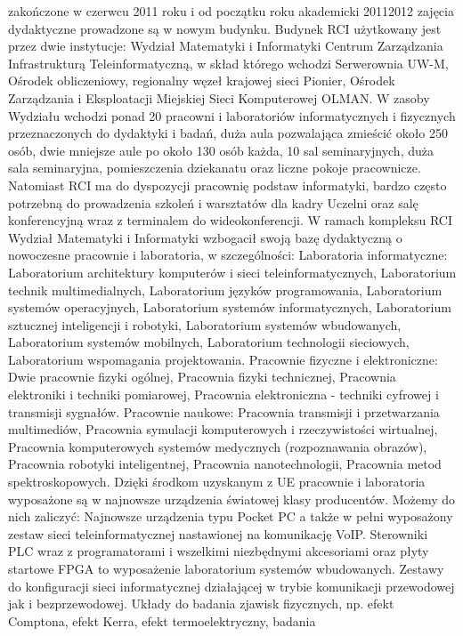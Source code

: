 \documentclass[a4paper,12pt]{article}
\begin{document}
zakończone w czerwcu 2011 roku i od początku roku akademicki 2011\/2012 zajęcia dydaktyczne prowadzone
są w nowym budynku.
Budynek RCI użytkowany jest przez dwie instytucje:
Wydział Matematyki i Informatyki
Centrum Zarządzania Infrastrukturą Teleinformatyczną, w skład którego wchodzi Serwerownia UW-M,
Ośrodek obliczeniowy, regionalny węzeł krajowej sieci Pionier, Ośrodek Zarządzania i Eksploatacji
Miejskiej Sieci Komputerowej OLMAN.
W zasoby Wydziału wchodzi ponad 20 pracowni i laboratoriów informatycznych i fizycznych przeznaczonych
do dydaktyki i badań, duża aula pozwalająca zmieścić około 250 osób, dwie mniejsze aule po około 130 osób
każda, 10 sal seminaryjnych, duża sala seminaryjna, pomieszczenia dziekanatu oraz liczne pokoje pracownicze.
Natomiast RCI ma do dyspozycji pracownię podstaw informatyki, bardzo często potrzebną do prowadzenia
szkoleń i warsztatów dla kadry Uczelni oraz salę konferencyjną wraz z terminalem do wideokonferencji.
W ramach kompleksu RCI Wydział Matematyki i Informatyki wzbogacił swoją bazę dydaktyczną o
nowoczesne pracownie i laboratoria, w szczególności:
Laboratoria informatyczne:
Laboratorium architektury komputerów i sieci teleinformatycznych,
Laboratorium technik multimedialnych,
Laboratorium języków programowania,
Laboratorium systemów operacyjnych,
Laboratorium systemów informatycznych,
Laboratorium sztucznej inteligencji i robotyki,
Laboratorium systemów wbudowanych,
Laboratorium systemów mobilnych,
Laboratorium technologii sieciowych,
Laboratorium wspomagania projektowania.
Pracownie fizyczne i elektroniczne:
Dwie pracownie fizyki ogólnej,
Pracownia fizyki technicznej,
Pracownia elektroniki i techniki pomiarowej,
Pracownia elektroniczna - techniki cyfrowej i transmisji sygnałów.
Pracownie naukowe:
Pracownia transmisji i przetwarzania multimediów,
Pracownia symulacji komputerowych i rzeczywistości wirtualnej,
Pracownia komputerowych systemów medycznych (rozpoznawania obrazów),
Pracownia robotyki inteligentnej,
Pracownia nanotechnologii,
Pracownia metod spektroskopowych.
Dzięki środkom uzyskanym z UE pracownie i laboratoria wyposażone są w najnowsze urządzenia światowej
klasy producentów. Możemy do nich zaliczyć:
Najnowsze urządzenia typu Pocket PC a także w pełni wyposażony zestaw sieci teleinformatycznej
nastawionej na komunikację VoIP.
Sterowniki PLC wraz z programatorami i wszelkimi niezbędnymi akcesoriami oraz płyty startowe FPGA
to wyposażenie laboratorium systemów wbudowanych.
Zestawy do konfiguracji sieci informatycznej działającej w trybie komunikacji przewodowej jak i
bezprzewodowej.
Układy do badania zjawisk fizycznych, np. efekt Comptona, efekt Kerra, efekt termoelektryczny, badania
\end{document}
